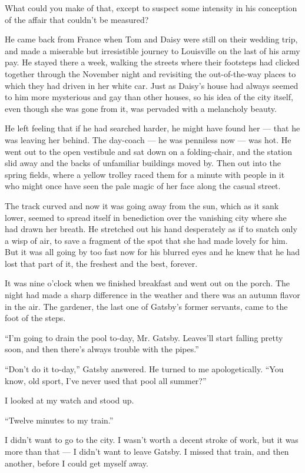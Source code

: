 \documentclass{znotebook}
\begin{document}
What could you make of that, except to suspect some intensity in his conception of the affair that couldn't be measured?

He came back from France when Tom and Daisy were still on their wedding trip, and made a miserable but irresistible journey to Louisville on the last of his army pay. He stayed there a week, walking the streets where their footsteps had clicked together through the November night and revisiting the out-of-the-way places to which they had driven in her white car. Just as Daisy's house had always seemed to him more mysterious and gay than other houses, so his idea of the city itself, even though she was gone from it, was pervaded with a melancholy beauty.

He left feeling that if he had searched harder, he might have found her — that he was leaving her behind. The day-coach — he was penniless now — was hot. He went out to the open vestibule and sat down on a folding-chair, and the station slid away and the backs of unfamiliar buildings moved by. Then out into the spring fields, where a yellow trolley raced them for a minute with people in it who might once have seen the pale magic of her face along the casual street.

The track curved and now it was going away from the sun, which as it sank lower, seemed to spread itself in benediction over the vanishing city where she had drawn her breath. He stretched out his hand desperately as if to snatch only a wisp of air, to save a fragment of the spot that she had made lovely for him. But it was all going by too fast now for his blurred eyes and he knew that he had lost that part of it, the freshest and the best, forever.

It was nine o'clock when we finished breakfast and went out on the porch. The night had made a sharp difference in the weather and there was an autumn flavor in the air. The gardener, the last one of Gatsby's former servants, came to the foot of the steps.

``I'm going to drain the pool to-day, Mr. Gatsby. Leaves'll start falling pretty soon, and then there's always trouble with the pipes.''

``Don't do it to-day,'' Gatsby answered. He turned to me apologetically. ``You know, old sport, I've never used that pool all summer?''

I looked at my watch and stood up.

``Twelve minutes to my train.''

I didn't want to go to the city. I wasn't worth a decent stroke of work, but it was more than that — I didn't want to leave Gatsby. I missed that train, and then another, before I could get myself away.
\end{document}
